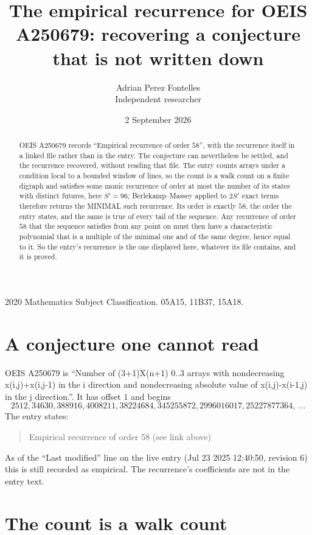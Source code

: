 \documentclass[11pt,a4paper]{article}
\title{The empirical recurrence for OEIS A250679: recovering a conjecture that is not written down}
\author{Adrian Perez Fontelles\\ \small Independent researcher}
\date{2 September 2026}
\theoremstyle{plain}
\theoremstyle{definition}
\begin{document}
\maketitle

\begin{abstract}
OEIS A250679 records ``Empirical recurrence of order $58$'', with the recurrence itself in a
linked file rather than in the entry. The conjecture can nevertheless be settled, and the
recurrence recovered, without reading that file. The entry counts arrays under a condition
local to a bounded window of lines, so the count is a walk count on a finite digraph and
satisfies some monic recurrence of order at most the number of its states with distinct
futures, here $S'=96$; Berlekamp--Massey applied to $2S'$ exact
terms therefore returns the MINIMAL such recurrence. Its order is exactly $58$, the order
the entry states, and the same is true of every tail of the sequence. Any recurrence of order
$58$ that the sequence satisfies from any point on must then have a characteristic
polynomial that is a multiple of the minimal one and of the same degree, hence equal to it. So
the entry's recurrence is the one displayed here, whatever its file contains, and it is
proved.
\end{abstract}

\noindent\small 2020 Mathematics Subject Classification. 05A15, 11B37, 15A18.\normalsize

\section{A conjecture one cannot read}

OEIS A250679 is ``Number of (3+1)X(n+1) 0..3 arrays with nondecreasing x(i,j)+x(i,j-1) in the i direction and nondecreasing absolute value of x(i,j)-x(i-1,j) in the j direction.''. It has offset $1$ and begins
\[
2512, 34630, 388916, 4008211, 38224684, 345255872, 2996016017, 25227877364,\ \dots
\]
The entry states:
\begin{quote}
Empirical recurrence of order 58 (see link above)
\end{quote}
As of the ``Last modified'' line on the live entry (Jul 23 2025 12:40:50, revision 6) this is still
recorded as empirical. The recurrence's coefficients are not in the entry text.

\section{The count is a walk count}
\end{document}
